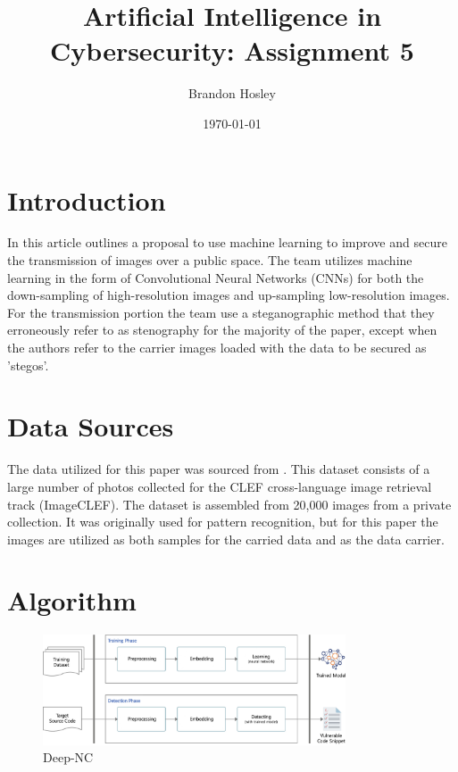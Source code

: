\documentclass[]{article}
\title{Artificial Intelligence in Cybersecurity: Assignment 5}
\author{Brandon Hosley}
\date{\today}
\begin{document}
	\maketitle
	
\section{Introduction}

In this article \cite{Vien2021} outlines a proposal to use machine learning to improve and secure the transmission of images over a public space.
The team utilizes machine learning in the form of Convolutional Neural Networks (CNNs) for both the down-sampling of high-resolution images and up-sampling low-resolution images.
For the transmission portion the team use a steganographic method that they erroneously refer to as stenography for the majority of the paper, except when the authors refer to the carrier images loaded with the data to be secured as 'stegos'.

\section{Data Sources}

The data utilized for this paper was sourced from \cite{Grubinger2006}.
This dataset consists of a large number of photos collected for the 
CLEF cross-language image retrieval track (ImageCLEF).
The dataset is assembled from 20,000 images from a private collection.
It was originally used for pattern recognition, but for this paper the images are utilized as both samples for the carried data and as the data carrier.

\section{Algorithm}



\begin{figure}[h]
	\centering
	\includegraphics[width=0.8\textwidth]{Algorithm}
	\caption{Deep-NC \cite{Vien2021}}
\end{figure}
\end{document}
